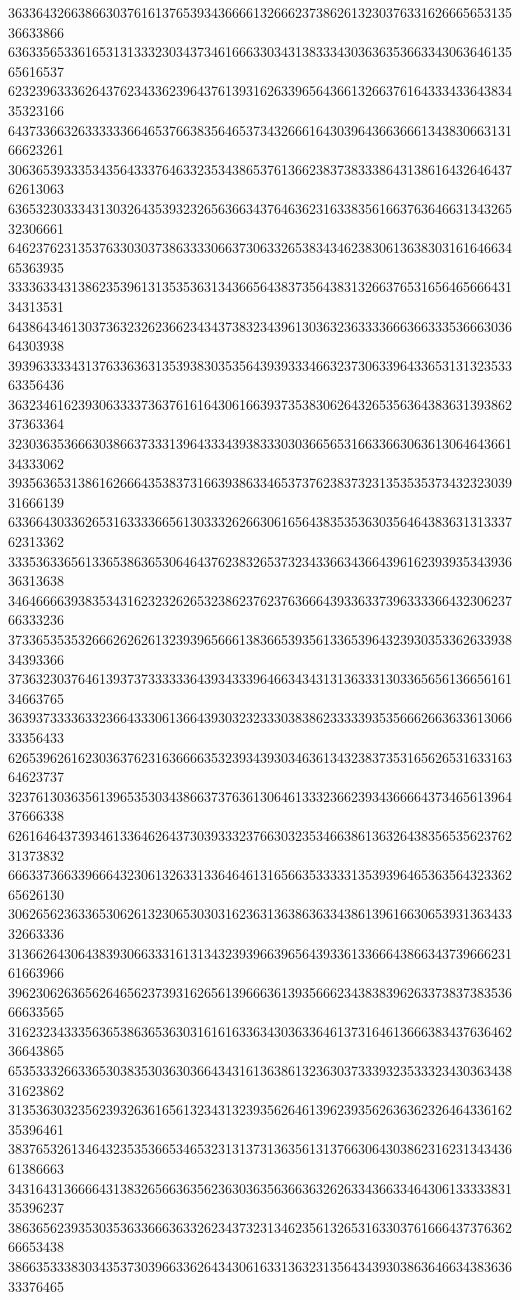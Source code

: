 36336432663866303761613765393436666132666237386261323037633162666565313536633866
63633565336165313133323034373461666330343138333430363635366334306364613565616537
62323963336264376234336239643761393162633965643661326637616433343364383435323166
64373366326333333664653766383564653734326661643039643663666134383066313166623261
30636539333534356433376463323534386537613662383738333864313861643264643762613063
63653230333431303264353932326563663437646362316338356166376364663134326532306661
64623762313537633030373863333066373063326538343462383061363830316164663465363935
33336334313862353961313535363134366564383735643831326637653165646566643134313531
64386434613037363232623662343437383234396130363236333366636633353666303664303938
39396333343137633636313539383035356439393334663237306339643365313132353363356436
36323461623930633337363761616430616639373538306264326535636438363139386237363364
32303635366630386637333139643334393833303036656531663366306361306464366134333062
39356365313861626664353837316639386334653737623837323135353537343232303931666139
63366430336265316333366561303332626630616564383535363035646438363131333762313362
33353633656133653863653064643762383265373234336634366439616239393534393636313638
34646666393835343162323262653238623762376366643933633739633336643230623766333236
37336535353266626262613239396566613836653935613365396432393035336263393834393366
37363230376461393737333333643934333964663434313136333130336565613665616134663765
36393733336332366433306136643930323233303838623333393535666266363361306633356433
62653962616230363762316366663532393439303463613432383735316562653163316364623737
32376130363561396535303438663737636130646133323662393436666437346561396437666338
62616464373934613364626437303933323766303235346638613632643835653562376231373832
66633736633966643230613263313364646131656635333331353939646536356432336265626130
30626562363365306261323065303031623631363863633438613961663065393136343332663336
31366264306438393066333161313432393966396564393361336664386634373966623161663966
39623062636562646562373931626561396663613935666234383839626337383738353666633565
31623234333563653863653630316161633634303633646137316461366638343763646236643865
65353332663365303835303630366434316136386132363037333932353332343036343831623862
31353630323562393263616561323431323935626461396239356263636232646433616235396461
38376532613464323535366534653231313731363561313766306430386231623134343661386663
34316431366664313832656636356236303635636636326263343663346430613333383135396237
38636562393530353633666363326234373231346235613265316330376166643737636266653438
38663533383034353730396633626434306163313632313564343930386364663438363633376465
